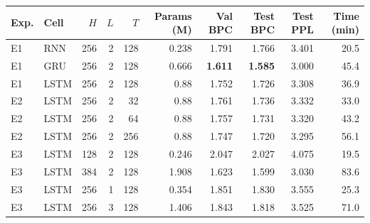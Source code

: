 \footnotesize
\begin{tabular}{llrrrrrrrr}
\toprule
Exp. & Cell & $H$ & $L$ & $T$ & Params (M) & Val BPC & Test BPC & Test PPL & Time (min) \\
\midrule
E1 & RNN & 256 & 2 & 128 & 0.238 & 1.791 & 1.766 & 3.401 & 20.5 \\
E1 & GRU & 256 & 2 & 128 & 0.666 & \textbf{1.611} & \textbf{1.585} & 3.000 & 45.4 \\
E1 & LSTM & 256 & 2 & 128 & 0.88 & 1.752 & 1.726 & 3.308 & 36.9 \\
E2 & LSTM & 256 & 2 & 32 & 0.88 & 1.761 & 1.736 & 3.332 & 33.0 \\
E2 & LSTM & 256 & 2 & 64 & 0.88 & 1.757 & 1.731 & 3.320 & 43.2 \\
E2 & LSTM & 256 & 2 & 256 & 0.88 & 1.747 & 1.720 & 3.295 & 56.1 \\
E3 & LSTM & 128 & 2 & 128 & 0.246 & 2.047 & 2.027 & 4.075 & 19.5 \\
E3 & LSTM & 384 & 2 & 128 & 1.908 & 1.623 & 1.599 & 3.030 & 83.6 \\
E3 & LSTM & 256 & 1 & 128 & 0.354 & 1.851 & 1.830 & 3.555 & 25.3 \\
E3 & LSTM & 256 & 3 & 128 & 1.406 & 1.843 & 1.818 & 3.525 & 71.0 \\
\bottomrule
\end{tabular}
